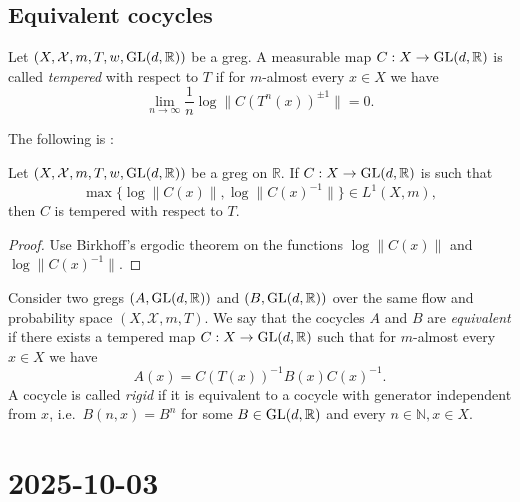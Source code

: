 \documentclass{report}
\begin{document}
\subsection{Equivalent cocycles}
    \begin{definition}
        Let $(X, \mathcal X, m, T, w, \operatorname{{\mathrm{GL}}}(d,\mathbb R))$ be a greg.
        A measurable map $C: X \to \operatorname{{\mathrm{GL}}}(d, \mathbb R)$ is called \emph{tempered} with respect to $T$ if for $m$-almost every $x \in X$ we have
        \[
        \lim_{ n \to \infty} \frac{1}{n} \log \|C(T^n(x))^{\pm 1}\| = 0.
        \]
    \end{definition}
    The following is \cite[Lemma S.2.4]{katok1995introduction}:
    \begin{lemma}
        Let $(X, \mathcal X, m, T, w, \operatorname{{\mathrm{GL}}}(d,\mathbb R))$ be a greg on $\mathbb R$.
        If $C: X \to \operatorname{{\mathrm{GL}}}(d, \mathbb R)$ is such that
        \[
        \max \{\log \|C(x)\|, \log \|C(x)^{-1}\|\} \in L^1(X, m),
        \]
        then $C$ is tempered with respect to $T$.
    \end{lemma}
    \begin{proof}
        Use Birkhoff's ergodic theorem on the functions $\log \|C(x)\|$ and $\log \|C(x)^{-1}\|$.
    \end{proof}
    \begin{definition}
        Consider two gregs $(A, \operatorname{{\mathrm{GL}}}(d,\mathbb R))$ and $(B, \operatorname{{\mathrm{GL}}}(d,\mathbb R))$ over the same flow and probability space $(X, \mathcal X, m, T)$.
        We say that the cocycles $A$ and $B$ are \emph{equivalent} if there exists a tempered map $C: X \to \operatorname{{\mathrm{GL}}}(d, \mathbb R)$ such that for $m$-almost every $x \in X$ we have
        \[
        A(x) = C(T(x))^{-1} B(x) C(x)^{-1}.
        \]
        A cocycle is called \emph{rigid} if it is equivalent to a cocycle with generator independent from $x$, i.e.\ $B(n,x) = B^n$ for some $B \in \operatorname{{\mathrm{GL}}}(d,\mathbb R)$ and every $n \in \mathbb N, x \in X$.
    \end{definition}

\section{2025-10-03}
\end{document}
